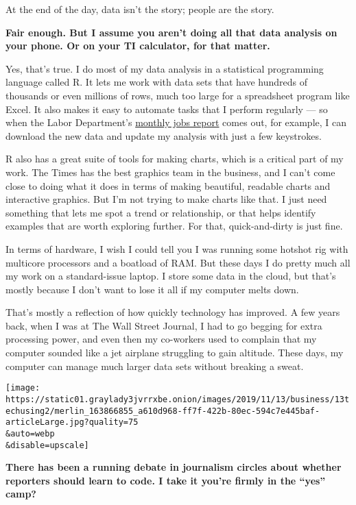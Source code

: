 At the end of the day, data isn't the story; people are the story.

\textbf{Fair enough. But I assume you aren't doing all that data
analysis on your phone. Or on your TI calculator, for that matter.}

Yes, that's true. I do most of my data analysis in a statistical
programming language called R. It lets me work with data sets that have
hundreds of thousands or even millions of rows, much too large for a
spreadsheet program like Excel. It also makes it easy to automate tasks
that I perform regularly --- so when the Labor Department's
\href{https://www.nytimes3xbfgragh.onion/2018/02/01/insider/insider-jobs-report.html}{monthly
jobs report} comes out, for example, I can download the new data and
update my analysis with just a few keystrokes.

R also has a great suite of tools for making charts, which is a critical
part of my work. The Times has the best graphics team in the business,
and I can't come close to doing what it does in terms of making
beautiful, readable charts and interactive graphics. But I'm not trying
to make charts like that. I just need something that lets me spot a
trend or relationship, or that helps identify examples that are worth
exploring further. For that, quick-and-dirty is just fine.

In terms of hardware, I wish I could tell you I was running some hotshot
rig with multicore processors and a boatload of RAM. But these days I do
pretty much all my work on a standard-issue laptop. I store some data in
the cloud, but that's mostly because I don't want to lose it all if my
computer melts down.

That's mostly a reflection of how quickly technology has improved. A few
years back, when I was at The Wall Street Journal, I had to go begging
for extra processing power, and even then my co-workers used to complain
that my computer sounded like a jet airplane struggling to gain
altitude. These days, my computer can manage much larger data sets
without breaking a sweat.

\texttt{[image: https://static01.graylady3jvrrxbe.onion/images/2019/11/13/business/13techusing2/merlin\_163866855\_a610d968-ff7f-422b-80ec-594c7e445baf-articleLarge.jpg?quality=75\\\&auto=webp\\\&disable=upscale]}

\textbf{There has been a running debate in journalism circles about
whether reporters should learn to code. I take it you're firmly in the
``yes'' camp?}

